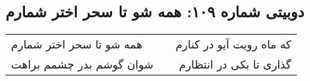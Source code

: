 \begin{center}
\section*{دوبیتی شماره ۱۰۹: همه شو تا سحر اختر شمارم}
\label{sec:109}
\begin{longtable}{l p{0.5cm} r}
همه شو تا سحر اختر شمارم
&&
که ماه رویت آیو در کنارم
\\
شوان گوشم بدر چشمم براهت
&&
گذاری تا بکی در انتظارم
\\
\end{longtable}
\end{center}
